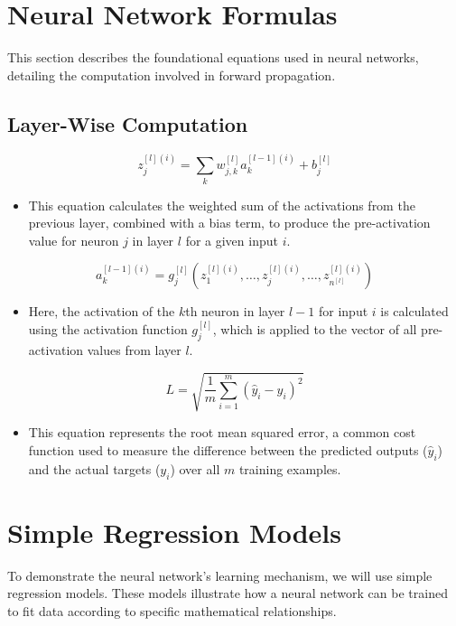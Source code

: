 \documentclass{article}
\begin{document}
\section{Neural Network Formulas}
This section describes the foundational equations used in neural networks, detailing the computation involved in forward propagation.

\subsection*{Layer-Wise Computation}
\begin{equation}
    z_{j}^{[l](i)} = \sum_{k} w_{j,k}^{[l]} a_{k}^{[l-1](i)} + b_{j}^{[l]} 
\end{equation}
\begin{itemize}
    \item This equation calculates the weighted sum of the activations from the previous layer, combined with a bias term, to produce the pre-activation value for neuron \(j\) in layer \(l\) for a given input \(i\).
\end{itemize}

\begin{equation}
    a_{k}^{[l-1](i)} = g_{j}^{[l]}\left(z_{1}^{[l](i)}, \dots, z_{j}^{[l](i)}, \dots, z_{n^{[l]}}^{[l](i)}\right)
\end{equation}
\begin{itemize}
    \item Here, the activation of the \(k\)th neuron in layer \(l-1\) for input \(i\) is calculated using the activation function \(g_{j}^{[l]}\), which is applied to the vector of all pre-activation values from layer \(l\).
\end{itemize}

\begin{equation}
    L = \sqrt{\frac{1}{m} \sum_{i=1}^m (\hat{y}_i - y_i)^2} 
\end{equation}
\begin{itemize}
    \item This equation represents the root mean squared error, a common cost function used to measure the difference between the predicted outputs (\(\hat{y}_i\)) and the actual targets (\(y_i\)) over all \(m\) training examples.
\end{itemize}

\section{Simple Regression Models}
To demonstrate the neural network's learning mechanism, we will use simple regression models. These models illustrate how a neural network can be trained to fit data according to specific mathematical relationships.
\end{document}
